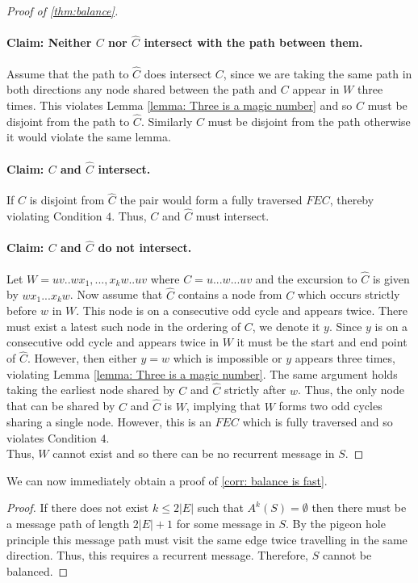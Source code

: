 \begin{proof}[Proof of \cref{thm:balance}]
    \paragraph{Claim: Neither $C$ nor $\hat{C}$ intersect with the path between them. }
    Assume that the path to $\hat{C}$ does intersect $C$, since we are taking the same path in both directions any node shared between the path and $C$ appear in $W$ three times. 
    This violates Lemma \ref{lemma: Three is a magic number} and so $C$ must be disjoint from the path to $\hat{C}$.
    Similarly $\hat{C}$ must be disjoint from the path otherwise it would violate the same lemma.
    ~\paragraph{Claim: $C$ and $\hat{C}$ intersect.}
    If $C$ is disjoint from $\hat{C}$ the pair would form a fully traversed $FEC$, thereby violating Condition $4$. Thus, $C$ and $\hat{C}$ must intersect.
    ~\paragraph{Claim: $C$ and $\hat{C}$ do not intersect. }
    Let $W=uv..wx_1,...,x_kw..uv$ where $C=u...w...uv$ and the excursion to $\hat{C}$ is given by $wx_1...x_kw$.
    Now assume that $\hat{C}$ contains a node from $C$ which occurs strictly before $w$ in $W$. This node is on a consecutive odd cycle and appears twice.
    There must exist a latest such node in the ordering of $C$, we denote it $y$.
    Since $y$ is on a consecutive odd cycle and appears twice in $W$ it must be the start and end point of $\hat{C}$. 
    However, then either $y=w$ which is impossible or $y$ appears three times, violating Lemma \ref{lemma: Three is a magic number}. 
    The same argument holds taking the earliest node shared by $C$ and $\hat{C}$ strictly after $w$. Thus, the only node that can be shared by $C$ and $\hat{C}$ is $W$, implying that $W$ forms two odd cycles sharing a single node.
    However, this is an $FEC$ which is fully traversed and so violates Condition $4$.\\
    Thus, $W$ cannot exist and so there can be no recurrent message in $S$.
\end{proof}
We can now immediately obtain a proof of \cref{corr: balance is fast}.
\begin{proof}
    If there does not exist $k\leq 2|E|$ such that $A^k(S)=\emptyset$ then there must be a message path of length $2|E|+1$ for some message in $S$.
    By the pigeon hole principle this message path must visit the same edge twice travelling in the same direction.
    Thus, this requires a recurrent message.
    Therefore, $S$ cannot be balanced.
\end{proof}